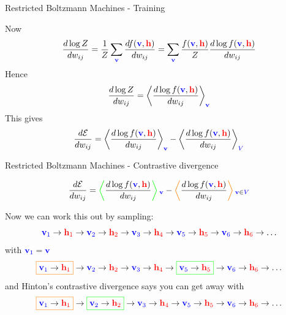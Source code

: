 \documentclass{beamer}
\newcommand{\vbf}{\color{blue}\mathbf{v}\color{black}}
\newcommand{\hbf}{\color{red}\mathbf{h}\color{black}}
\newcommand{\bigv}{\color{blue}V\color{black}}
\newcommand{\cor}{\color{reddish}{}}
\newcommand{\cob}{\color{black}{}}
\begin{document}
\begin{frame}{Restricted Boltzmann Machines - Training}

  \cor{}Now\cob{}
  $$
  \frac{d\log{Z}}{dw_{ij}}=\frac{1}{Z}\sum_{\vbf}\frac{d f(\vbf,\hbf)}{dw_{ij}}= \sum_{\vbf}\frac{f(\vbf,\hbf)}{Z}\frac{d \log{f(\vbf,\hbf)}}{dw_{ij}} 
  $$
  \cor{}Hence\cob{}
  $$
  \frac{d\log{Z}}{dw_{ij}}=\left\langle\frac{d \log{f(\vbf,\hbf)}}{dw_{ij}}\right\rangle_{\vbf} 
  $$
  \cor{}This gives\cob{}
  $$
  \frac{d\mathcal{E}}{dw_{ij}}=\left\langle\frac{d \log{f(\vbf,\hbf)}}{dw_{ij}}\right\rangle_{\vbf} -\left\langle\frac{d \log{f(\vbf,\hbf)}}{dw_{ij}}\right\rangle_{\bigv}
  $$
  \end{frame}


\begin{frame}{Restricted Boltzmann Machines - Contrastive divergence}

  $$
  \frac{d\mathcal{E}}{dw_{ij}}=\color{green}\left\langle\color{black}\frac{d \log{f(\vbf,\hbf)}}{dw_{ij}}\color{green}\right\rangle_{\vbf}\color{black}{} -\color{orange}\left\langle\color{black}\frac{d \log{f(\vbf,\hbf)}}{dw_{ij}}\color{orange}\right\rangle\color{black}_{\vbf\in\bigv}
  $$
  
  \cor{}Now we can work this out by sampling:
  $$
  \color{blue}\mathbf{v}_1\color{black}\rightarrow\color{red}\mathbf{h}_1\color{black}\rightarrow
  \color{blue}\mathbf{v}_2\color{black}\rightarrow\color{red}\mathbf{h}_2\color{black}\rightarrow
  \color{blue}\mathbf{v}_3\color{black}\rightarrow\color{red}\mathbf{h}_4\color{black}\rightarrow
  \color{blue}\mathbf{v}_5\color{black}\rightarrow\color{red}\mathbf{h}_5\color{black}\rightarrow
  \color{blue}\mathbf{v}_6\color{black}\rightarrow\color{red}\mathbf{h}_6\color{black}\rightarrow\ldots
  $$
\cor{}with\cob{} $\color{blue}\mathbf{v}_1\color{black}=\vbf$\cob{}
  $$
  \color{orange}\boxed{\color{blue}\mathbf{v}_1\color{black}\rightarrow
  \color{red}\mathbf{h}_1\color{black}}\color{black}\rightarrow\color{blue}\mathbf{v}_2\color{black}
  \rightarrow\color{red}\mathbf{h}_2\color{black}\rightarrow
  \color{blue}\mathbf{v}_3\color{black}\rightarrow\color{red}\mathbf{h}_4\color{black}\rightarrow
  \color{green}\boxed{\color{blue}\mathbf{v}_5\color{black}\rightarrow\color{red}\mathbf{h}_5\color{black}}\color{black}\rightarrow
  \color{blue}\mathbf{v}_6\color{black}\rightarrow\color{red}\mathbf{h}_6\color{black}\rightarrow\ldots
 $$
\cor{}and Hinton's contrastive divergence says you can get away with  
  $$
  \color{orange}\boxed{\color{blue}\mathbf{v}_1\color{black}\rightarrow
  \color{red}\mathbf{h}_1\color{black}}\color{black}\rightarrow \color{green}\boxed{\color{blue}\mathbf{v}_2\color{black}
  \rightarrow\color{red}\mathbf{h}_2\color{black}}\color{black}\rightarrow
  \color{blue}\mathbf{v}_3\color{black}\rightarrow\color{red}\mathbf{h}_4\color{black}\rightarrow
  \color{blue}\mathbf{v}_5\color{black}\rightarrow\color{red}\mathbf{h}_5\color{black}\rightarrow
  \color{blue}\mathbf{v}_6\color{black}\rightarrow\color{red}\mathbf{h}_6\color{black}\rightarrow\ldots
  $$

  \end{frame}
\end{document}
